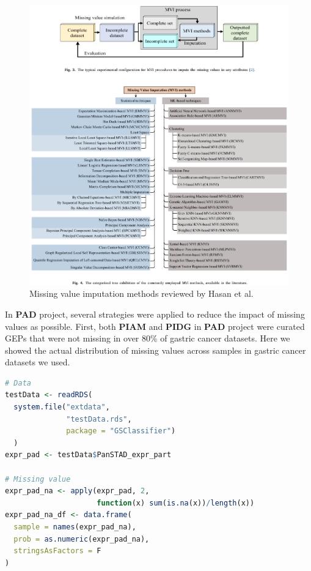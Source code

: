 \documentclass[
  12pt,
]{book}
\begin{document}
\begin{figure}

{\centering \includegraphics[width=0.9\linewidth]{./fig/mvi-01} 

}

\caption{Missing value imputation methods reviewed by Hasan et al.}\label{fig:mvi01}
\end{figure}

In \textbf{PAD} project, several strategies were applied to reduce the impact of missing values as possible. First, both \textbf{PIAM} and \textbf{PIDG} in \textbf{PAD} project were curated GEPs that were not missing in over 80\% of gastric cancer datasets. Here we showed the actual distribution of missing values across samples in gastric cancer datasets we used.

\begin{lstlisting}[language=R]
# Data
testData <- readRDS(
  system.file("extdata", 
              "testData.rds", 
              package = "GSClassifier")
  )
expr_pad <- testData$PanSTAD_expr_part

# Missing value
expr_pad_na <- apply(expr_pad, 2, 
                     function(x) sum(is.na(x))/length(x))
expr_pad_na_df <- data.frame(
  sample = names(expr_pad_na),
  prob = as.numeric(expr_pad_na),
  stringsAsFactors = F
)
\end{lstlisting}
\end{document}
